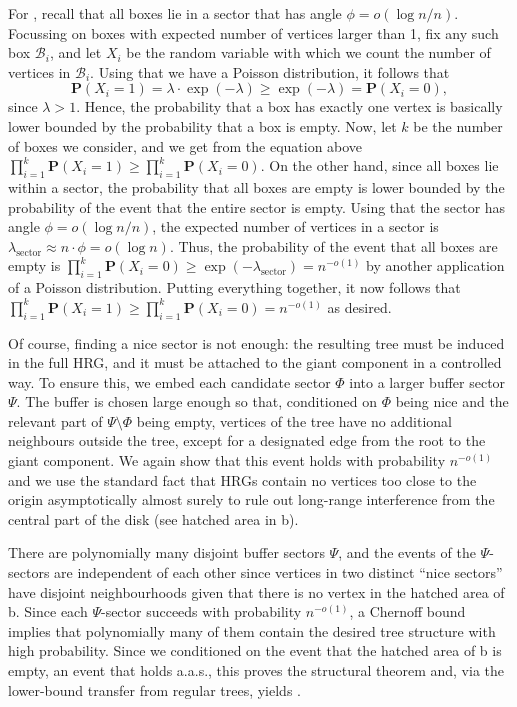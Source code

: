 \documentclass[letterpaper,11pt]{article}
\newcommand{\Prob}[1]{\mathbf{P}\left(#1\right)}
\newcommand{\aas}{a.a.s.\xspace}
\newcommand{\B}{\mathcal B}
\newcommand{\1}{\mathbb I}
\begin{document}
For , recall that all boxes lie in a sector that has angle $\phi = o(\log n / n)$. Focussing on boxes with expected number of vertices larger than 1, fix any such box $\B_i$, and let $X_i$ be the random variable with which we count the number of vertices in $\B_i$. Using that we have a Poisson distribution, it follows that
%
$$\Prob{X_i = 1} = \lambda \cdot \exp(-\lambda) \geq \exp(-\lambda) = \Prob{X_i = 0},$$
%
since $\lambda > 1$. Hence, the probability that a box has exactly one vertex is basically lower bounded by the probability that a box is empty. Now, let $k$ be the number of boxes we consider, and we get from the equation above
%
$\prod_{i=1}^k \Prob{X_i = 1} \geq \prod_{i=1}^k\Prob{X_i = 0}.$
%
On the other hand, since all boxes lie within a sector, the probability that all boxes are empty is lower bounded by the probability of the event that the entire sector is empty. Using that the sector has angle $\phi = o(\log n / n)$, the expected number of vertices in a sector is $\lambda_{\text{sector}} \approx n\cdot \phi = o(\log n)$. Thus, the probability of the event that all boxes are empty is $\prod_{i=1}^k\Prob{X_i = 0} \geq \exp{(-\lambda_{\text{sector}})} = n^{-o(1)}$ by another application of a Poisson distribution. Putting everything together, it now follows that $\prod_{i=1}^k \Prob{X_i = 1}  \geq \prod_{i=1}^k\Prob{X_i = 0} = n^{-o(1)}$ as desired.

Of course, finding a nice sector is not enough: the resulting tree must be induced in the full HRG, and it must be attached to the giant component in a controlled way. To ensure this, we embed each candidate sector $\Phi$ into a larger buffer sector $\Psi$. The buffer is chosen large enough so that, conditioned on $\Phi$ being nice and the relevant part of $\Psi \setminus \Phi$ being empty, vertices of the tree have no additional neighbours outside the tree, except for a designated edge from the root to the giant component. We again show that this event holds with probability $n^{-o(1)}$ and we use the standard fact that HRGs contain no vertices too close to the origin asymptotically almost surely to rule out long-range interference from the central part of the disk (see hatched area in b).

There are polynomially many disjoint buffer sectors $\Psi$, and the events of the $\Psi$-sectors are independent of each other since vertices in two distinct ``nice sectors'' have disjoint neighbourhoods given that there is no vertex in the hatched area of b. Since each $\Psi$-sector succeeds with probability $n^{-o(1)}$, a Chernoff bound implies that polynomially many of them contain the desired tree structure with high probability. Since we conditioned on the event that the hatched area of b is empty, an event that holds \aas,  this proves the structural theorem and, via the lower-bound transfer from regular trees, yields .
\end{document}
